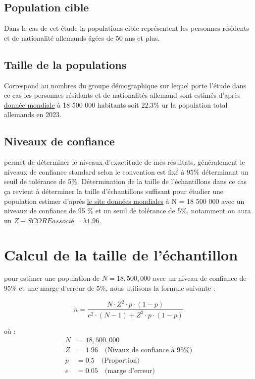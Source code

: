 \documentclass[a4paper]{article}
\begin{document}
	\subsection{Population cible}  
	Dans le cas de cet étude la populations cible représentent les personnes résidents et de nationalité allemands âgées de 50 ans et plus.
	\subsection{Taille de la populations}  
	Correspond au nombres du groupe démographique sur lequel porte l’étude dans ce cas les personnes résidants et de nationalités allemand sont estimés d’après \href{https://www.donneesmondiales.com/}{donnée mondiale} à 18 500 000 habitants soit $22.3 \% $ ur la population total allemands en 2023.
	
	\subsection{Niveaux de confiance}
	
	 permet de déterminer le niveaux d’exactitude de mes résultats, généralement le niveaux de confiance standard selon le convention est fixé à 95\% déterminant un seuil de tolérance de 5\%.
	Détermination de la taille de l’échantillons dans ce cas ça revient à déterminer la taille d’échantillons suffisant pour étudier une population estimer d'après \href{https://www.donneesmondiales.com/}{le site données mondiales} à N = 18 500 000 avec un niveaux de confiance de 95 \% et un seuil de tolérance de 5\%, notamment on aura un $Z-SCORE associé = à 1.96$.
	 
	
	\section*{Calcul de la taille de l'échantillon}
	
	pour estimer une population de \( N = 18{,}500{,}000 \) avec un niveau de confiance de 95\% et une marge d'erreur de 5\%, nous utilisons la formule suivante :
	
	\[
	n = \frac{N \cdot Z^2 \cdot p \cdot (1-p)}{e^2 \cdot (N-1) + Z^2 \cdot p \cdot (1-p)}
	\]
	
	où :
	\begin{align*}
		N & = 18{,}500{,}000 \\
		Z & = 1.96 \quad \text{(Nivaux de confiance à 95\%)} \\
		p & = 0.5 \quad \text{(Proportion)} \\
		e & = 0.05 \quad \text{(marge d'erreur)} \\
	\end{align*}
	
\end{document}
